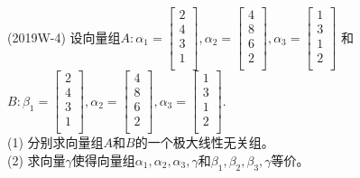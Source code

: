 \documentclass[lang=cn,newtx,10pt,scheme=chinese]{elegantbook}
\begin{document}
\begin{exercise}
    (2019W-4) 设向量组$A: \alpha_1=
    \left[
    \begin{matrix}
        2 \\
        4 \\
        3 \\
        1 \\
    \end{matrix}
    \right],\alpha_2=
    \left[
    \begin{matrix}
        4 \\
        8 \\
        6 \\
        2 \\
    \end{matrix}
    \right],\alpha_3=
    \left[
    \begin{matrix}
        1 \\
        3 \\
        1 \\
        2 \\
    \end{matrix}
    \right]
    $
    和$B: \beta_1=
    \left[
    \begin{matrix}
        2 \\
        4 \\
        3 \\
        1 \\
    \end{matrix}
    \right],\alpha_2=
    \left[
    \begin{matrix}
        4 \\
        8 \\
        6 \\
        2 \\
    \end{matrix}
    \right],\alpha_3=
    \left[
    \begin{matrix}
        1 \\
        3 \\
        1 \\
        2 \\
    \end{matrix}
    \right]
    $. \\
    (1) 分别求向量组$A$和$B$的一个极大线性无关组。\\
    (2) 求向量$\gamma$使得向量组$\alpha_1,\alpha_2,\alpha_3,\gamma$和$\beta_1,\beta_2,\beta_3,\gamma$等价。
\end{exercise}
\end{document}
